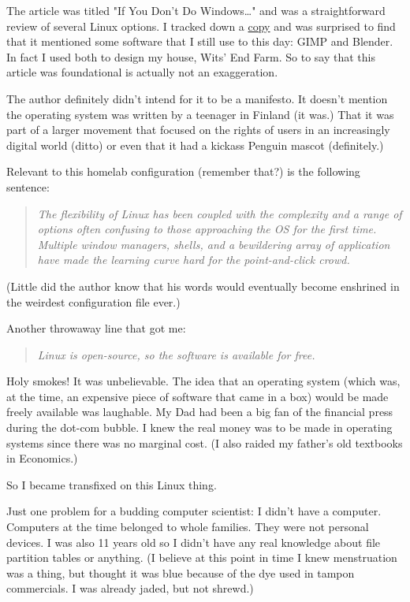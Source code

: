 \documentclass[11pt]{article}
\begin{document}
The article was titled "If You Don't Do Windows\ldots{}" and was a straightforward review of several Linux options. I tracked down a \href{https://books.google.com/books?id=wwM2AxyTBIUC\&pg=PA144\&dq=Xandros\&hl=en\&sa=X\&ved=2ahUKEwjxkrqa7uiUAxU85ckDHePHN9sQ6AF6BAgMEAM\#v=onepage\&q=Xandros\&f=false}{copy} and was surprised to find that it mentioned some software that I still use to this day: GIMP and Blender. In fact I used both to design my house, Wits' End Farm. So to say that this article was foundational is actually not an exaggeration.

The author definitely didn't intend for it to be a manifesto. It doesn't mention the operating system was written by a teenager in Finland (it was.) That it was part of a larger movement that focused on the rights of users in an increasingly digital world (ditto) or even that it had a kickass Penguin mascot (definitely.)

Relevant to this homelab configuration (remember that?) is the following sentence:

\begin{quote}
\emph{The flexibility of Linux has been coupled with the complexity and a range of options often confusing to those approaching the OS for the first time. Multiple window managers, shells, and a bewildering array of application have made the learning curve hard for the point-and-click crowd.}
\end{quote}

(Little did the author know that his words would eventually become enshrined in the weirdest configuration file ever.)

Another throwaway line that got me:

\begin{quote}
\emph{Linux is open-source, so the software is available for free.}
\end{quote}

Holy smokes! It was unbelievable. The idea that an operating system (which was, at the time, an expensive piece of software that came in a box) would be made freely available was laughable. My Dad had been a big fan of the financial press during the dot-com bubble. I knew the real money was to be made in operating systems since there was no marginal cost. (I also raided my father's old textbooks in Economics.) 

So I became transfixed on this Linux thing.

Just one problem for a budding computer scientist: I didn't have a computer. Computers at the time belonged to whole families. They were not personal devices. I was also 11 years old so I didn't have any real knowledge about file partition tables or anything. (I believe at this point in time I knew menstruation was a thing, but thought it was blue because of the dye used in tampon commercials. I was already jaded, but not shrewd.) 
\end{document}
